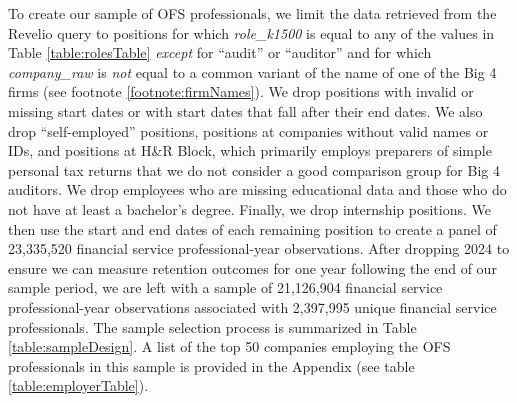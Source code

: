 \documentclass[11pt]{article}
\begin{document}
        To create our sample of OFS professionals, we limit the data retrieved from the Revelio query to positions for which \textit{role\_k1500} is equal to any of the values in Table \ref{table:rolesTable} \textit{except} for ``audit'' or ``auditor'' and for which \textit{company\_raw} is \textit{not} equal to a common variant of the name of one of the Big 4 firms (see footnote \ref{footnote:firmNames}). We drop positions with invalid or missing start dates or with start dates that fall after their end dates. We also drop ``self-employed'' positions, positions at companies without valid names or IDs, and positions at H\&R Block, which primarily employs preparers of simple personal tax returns that we do not consider a good comparison group for Big 4 auditors. We drop employees who are missing educational data and those who  do not have at least a bachelor's degree. Finally, we drop internship positions. We then use the start and end dates of each remaining position to create a panel of 23,335,520 financial service professional-year observations. After dropping 2024 to ensure we can measure retention outcomes for one year following the end of our sample period, we are left with a sample of 21,126,904 financial service professional-year observations associated with 2,397,995 unique financial service professionals. The sample selection process is summarized in Table \ref{table:sampleDesign}. A list of the top 50 companies employing the OFS professionals in this sample is provided in the Appendix (see table \ref{table:employerTable}).
\end{document}
